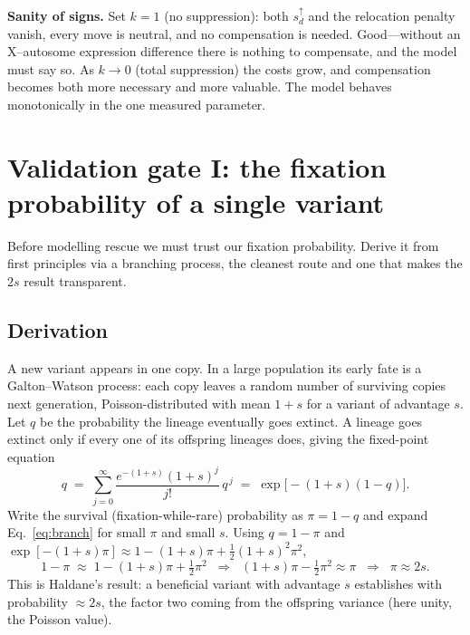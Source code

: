 \documentclass[11pt,a4paper]{article}
\begin{document}
\begin{checkpoint}
\textbf{Sanity of signs.} Set $k=1$ (no suppression): both $s_d^{\uparrow}$ and the relocation penalty vanish, every move is neutral, and no compensation is needed. Good---without an X--autosome expression difference there is nothing to compensate, and the model must say so. As $k\to 0$ (total suppression) the costs grow, and compensation becomes both more necessary and more valuable. The model behaves monotonically in the one measured parameter.
\end{checkpoint}

\section{Validation gate I: the fixation probability of a single variant}

Before modelling rescue we must trust our fixation probability. Derive it from first principles via a branching process, the cleanest route and one that makes the $2s$ result transparent.

\subsection{Derivation}

A new variant appears in one copy. In a large population its early fate is a Galton--Watson process: each copy leaves a random number of surviving copies next generation, Poisson-distributed with mean $1+s$ for a variant of advantage $s$. Let $q$ be the probability the lineage eventually goes extinct. A lineage goes extinct only if every one of its offspring lineages does, giving the fixed-point equation
\begin{equation}
q \;=\; \sum_{j=0}^{\infty} \frac{e^{-(1+s)}(1+s)^j}{j!}\,q^{\,j} \;=\; \exp\!\big[-(1+s)(1-q)\big].
\label{eq:branch}
\end{equation}
Write the survival (fixation-while-rare) probability as $\pi = 1-q$ and expand Eq.~\eqref{eq:branch} for small $\pi$ and small $s$. Using $q=1-\pi$ and $\exp[-(1+s)\pi]\approx 1-(1+s)\pi+\tfrac12(1+s)^2\pi^2$,
\begin{equation}
1-\pi \;\approx\; 1-(1+s)\pi+\tfrac12\pi^2 \;\;\Longrightarrow\;\; (1+s)\pi-\tfrac12\pi^2 \approx \pi \;\;\Longrightarrow\;\; \pi \approx 2s.
\label{eq:haldane}
\end{equation}
This is Haldane's result: a beneficial variant with advantage $s$ establishes with probability $\approx 2s$, the factor two coming from the offspring variance (here unity, the Poisson value).
\end{document}
